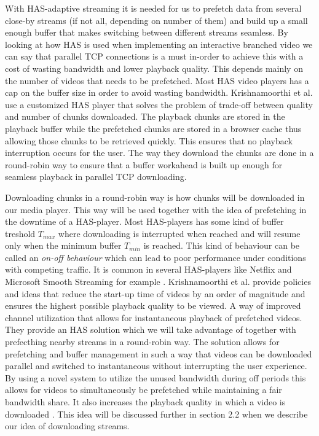 \documentclass[9pt,a4paper]{acmproc}
\begin{document}
With HAS-adaptive streaming it is needed for us to prefetch data from several close-by streams (if not all, depending on number of them) and build up a small enough buffer that makes switching between different streams seamless. By looking at how HAS is used when implementing an interactive branched video we can say that parallel TCP connections is a must in-order to achieve this with a cost of wasting bandwidth and lower playback quality. This depends mainly on the number of videos that needs to be prefetched. Most HAS video players has a cap on the buffer size in order to avoid wasting bandwidth. Krishnamoorthi et al. \cite{qualbranch} use a customized HAS player that solves the problem of trade-off between quality and number of chunks downloaded. The playback chunks are stored in the playback buffer while the prefetched chunks are stored in a browser cache thus allowing those chunks to be retrieved quickly. This ensures that no playback interruption occurs for the user. The way they download the chunks are done in a round-robin way to ensure that a buffer workahead is built up enough for seamless playback in parallel TCP downloading. 

Downloading chunks in a round-robin way is how chunks will be downloaded in our media player. This way will be used together with the idea of prefetching in the downtime of a HAS-player. Most HAS-players has some kind of buffer treshold $T_{max}$ where downloading is interrupted when reached and will resume only when the minimum buffer $T_{min}$ is reached. This kind of behaviour can be called an \textit{on-off behaviour} which can lead to poor performance under conditions with competing traffic. It is common in several HAS-players like Netflix and Microsoft Smooth Streaming for example \cite{bandawarePrefetch}. Krishnamoorthi et al. \cite{bandawarePrefetch} provide policies and ideas that reduce the start-up time of videos by an order of magnitude and ensures the highest possible playback quality to be viewed. A way of improved channel utilization that allows for instantaneous playback of prefetched videos. They provide an HAS solution which we will take advantage of together with prefecthing nearby streams in a round-robin way. The solution allows for prefetching and buffer management in such a way that videos can be downloaded parallel and switched to instantaneous without interrupting the user experience. By using a novel system to utilize the unused bandwidth during off periods this allows for videos to simultaneously be prefetched while maintaining a fair bandwidth share. It also increases the playback quality in which a video is downloaded \cite{bandawarePrefetch}. This idea will be discussed further in section 2.2 when we describe our idea of downloading streams.
\end{document}
